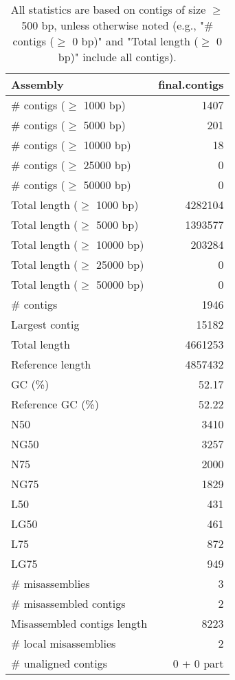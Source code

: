 \documentclass[12pt,a4paper]{article}
\begin{document}
\begin{table}[ht]
\begin{center}
\caption{All statistics are based on contigs of size $\geq$ 500 bp, unless otherwise noted (e.g., "\# contigs ($\geq$ 0 bp)" and "Total length ($\geq$ 0 bp)" include all contigs).}
\begin{tabular}{|l*{1}{|r}|}
\hline
Assembly & final.contigs \\ \hline
\# contigs ($\geq$ 1000 bp) & 1407 \\ \hline
\# contigs ($\geq$ 5000 bp) & 201 \\ \hline
\# contigs ($\geq$ 10000 bp) & 18 \\ \hline
\# contigs ($\geq$ 25000 bp) & 0 \\ \hline
\# contigs ($\geq$ 50000 bp) & 0 \\ \hline
Total length ($\geq$ 1000 bp) & 4282104 \\ \hline
Total length ($\geq$ 5000 bp) & 1393577 \\ \hline
Total length ($\geq$ 10000 bp) & 203284 \\ \hline
Total length ($\geq$ 25000 bp) & 0 \\ \hline
Total length ($\geq$ 50000 bp) & 0 \\ \hline
\# contigs & 1946 \\ \hline
Largest contig & 15182 \\ \hline
Total length & 4661253 \\ \hline
Reference length & 4857432 \\ \hline
GC (\%) & 52.17 \\ \hline
Reference GC (\%) & 52.22 \\ \hline
N50 & 3410 \\ \hline
NG50 & 3257 \\ \hline
N75 & 2000 \\ \hline
NG75 & 1829 \\ \hline
L50 & 431 \\ \hline
LG50 & 461 \\ \hline
L75 & 872 \\ \hline
LG75 & 949 \\ \hline
\# misassemblies & 3 \\ \hline
\# misassembled contigs & 2 \\ \hline
Misassembled contigs length & 8223 \\ \hline
\# local misassemblies & 2 \\ \hline
\# unaligned contigs & 0 + 0 part \\ \hline

\end{tabular}
\end{center}
\end{table}
\end{document}
